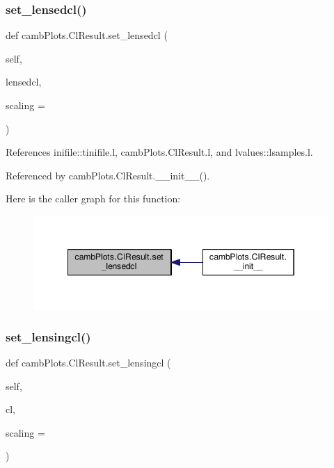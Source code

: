 \subsubsection{\texorpdfstring{set\+\_\+lensedcl()}{set\_lensedcl()}}
{\footnotesize\ttfamily def camb\+Plots.\+Cl\+Result.\+set\+\_\+lensedcl (\begin{DoxyParamCaption}\item[{}]{self,  }\item[{}]{lensedcl,  }\item[{}]{scaling = {} }\end{DoxyParamCaption})}



References inifile\+::tinifile.\+l, camb\+Plots.\+Cl\+Result.\+l, and lvalues\+::lsamples.\+l.



Referenced by camb\+Plots.\+Cl\+Result.\+\_\+\+\_\+init\+\_\+\+\_\+().

Here is the caller graph for this function\+:
\nopagebreak
\begin{figure}[H]
\begin{center}
\leavevmode
\includegraphics[width=346pt]{classcambPlots_1_1ClResult_a274c3abd74f9d6bc3a2a94428abce3a0_icgraph}
\end{center}
\end{figure}
\mbox{\label{classcambPlots_1_1ClResult_a8d99b24daec518d36af637dbe89cfa22}} 
\subsubsection{\texorpdfstring{set\+\_\+lensingcl()}{set\_lensingcl()}}
{\footnotesize\ttfamily def camb\+Plots.\+Cl\+Result.\+set\+\_\+lensingcl (\begin{DoxyParamCaption}\item[{}]{self,  }\item[{}]{cl,  }\item[{}]{scaling = {} }\end{DoxyParamCaption})}



